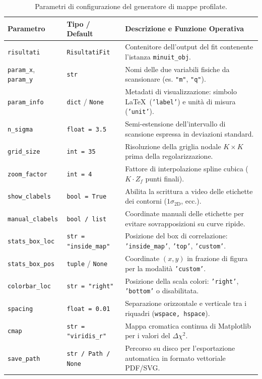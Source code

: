 \documentclass[11pt,a4paper]{article}
\begin{document}
\begin{table}[htbp]
\centering
\small
\begin{tabularx}{\textwidth}{l p{2.8cm} X}
\toprule
\textbf{Parametro} & \textbf{Tipo / Default} & \textbf{Descrizione e Funzione Operativa} \\
\midrule
\texttt{risultati} & \texttt{RisultatiFit} & Contenitore dell'output del fit contenente l'istanza \texttt{minuit\_obj}. \\
\texttt{param\_x}, \texttt{param\_y} & \texttt{str} & Nomi delle due variabili fisiche da scansionare (es. \texttt{"m"}, \texttt{"q"}). \\
\texttt{param\_info} & \texttt{dict} / \texttt{None} & Metadati di visualizzazione: simbolo \LaTeX\ (\texttt{'label'}) e unità di misura (\texttt{'unit'}). \\
\texttt{n\_sigma} & \texttt{float = 3.5} & Semi-estensione dell'intervallo di scansione espressa in deviazioni standard. \\
\texttt{grid\_size} & \texttt{int = 35} & Risoluzione della griglia nodale $K \times K$ prima della regolarizzazione. \\
\texttt{zoom\_factor} & \texttt{int = 4} & Fattore di interpolazione spline cubica ($K \cdot Z_f$ punti finali). \\
\texttt{show\_clabels} & \texttt{bool = True} & Abilita la scrittura a video delle etichette dei contorni ($1\sigma_{\text{2D}}$, ecc.). \\
\texttt{manual\_clabels} & \texttt{bool / list} & Coordinate manuali delle etichette per evitare sovrapposizioni su curve ripide. \\
\texttt{stats\_box\_loc} & \texttt{str = "inside\_map"} & Posizione del box di correlazione: \texttt{'inside\_map'}, \texttt{'top'}, \texttt{'custom'}. \\
\texttt{stats\_box\_pos} & \texttt{tuple} / \texttt{None} & Coordinate $(x, y)$ in frazione di figura per la modalità \texttt{'custom'}. \\
\texttt{colorbar\_loc} & \texttt{str = "right"} & Posizione della scala colori: \texttt{'right'}, \texttt{'bottom'} o disabilitata. \\
\texttt{spacing} & \texttt{float = 0.01} & Separazione orizzontale e verticale tra i riquadri (\texttt{wspace, hspace}). \\
\texttt{cmap} & \texttt{str = "viridis\_r"} & Mappa cromatica continua di Matplotlib per i valori del $\Delta\chi^2$. \\
\texttt{save\_path} & \texttt{str / Path / None} & Percorso su disco per l'esportazione automatica in formato vettoriale PDF/SVG. \\
\bottomrule
\end{tabularx}
\caption{Parametri di configurazione del generatore di mappe profilate.}
\end{table}
\end{document}
